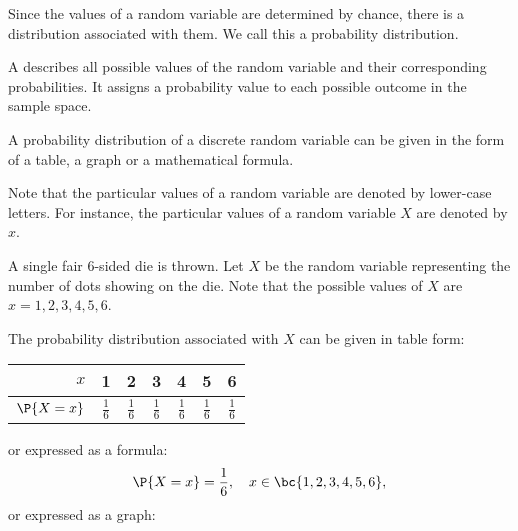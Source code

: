 Since the values of a random variable are determined by chance, there is a distribution associated with them. We call this a probability distribution.

\begin{definition}
    A  describes all possible values of the random variable and their corresponding probabilities. It assigns a probability value to each possible outcome in the sample space.
\end{definition}

A probability distribution of a discrete random variable can be given in the form of a table, a graph or a mathematical formula.

Note that the particular values of a random variable are denoted by lower-case letters. For instance, the particular values of a random variable $X$ are denoted by $x$.

\begin{example}
    A single fair 6-sided die is thrown. Let $X$ be the random variable representing the number of dots showing on the die. Note that the possible values of $X$ are $x = 1, 2, 3, 4, 5, 6$.

    The probability distribution associated with $X$ can be given in table form:
    \begin{center}
        \begin{tabular}{|r|c|c|c|c|c|c|}
            \hline
            $x$ & 1 & 2 & 3 & 4 & 5 & 6 \\ \hline
            $\P{X = x}$ & $\frac16$ & $\frac16$ & $\frac16$ & $\frac16$ & $\frac16$ & $\frac16$ \\ \hline
        \end{tabular}
    \end{center}
    or expressed as a formula: \[\P{X = x} = \frac16, \quad x \in \bc{1, 2, 3, 4, 5, 6},\] or expressed as a graph:
    \begin{center}
    \end{center}
\end{example}

